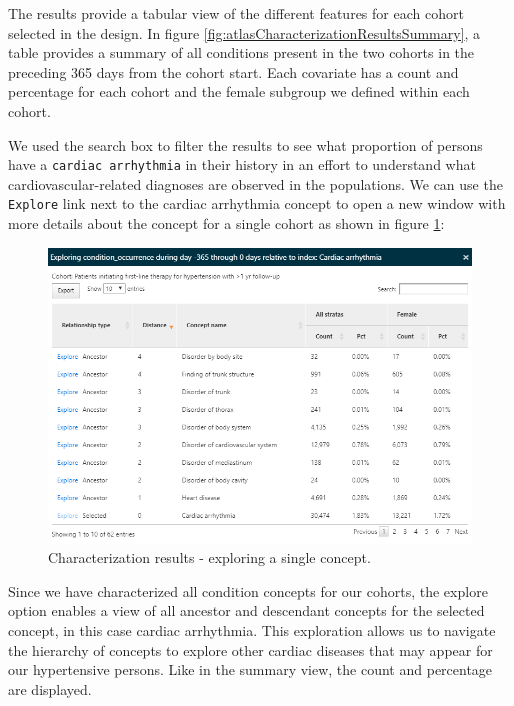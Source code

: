 \documentclass[11pt]{book}
\theoremstyle{definition}
\theoremstyle{definition}
\theoremstyle{definition}
\theoremstyle{remark}
\begin{document}
The results provide a tabular view of the different features for each cohort selected in the design. In figure \ref{fig:atlasCharacterizationResultsSummary}, a table provides a summary of all conditions present in the two cohorts in the preceding 365 days from the cohort start. Each covariate has a count and percentage for each cohort and the female subgroup we defined within each cohort.

We used the search box to filter the results to see what proportion of persons have a \texttt{cardiac\ arrhythmia} in their history in an effort to understand what cardiovascular-related diagnoses are observed in the populations. We can use the \texttt{Explore} link next to the cardiac arrhythmia concept to open a new window with more details about the concept for a single cohort as shown in figure \ref{fig:atlasCharacterizationResultsExplore}:

\begin{figure}

{\centering \includegraphics[width=1\linewidth]{images/Characterization/atlasCharacterizationResultsExplore} 

}

\caption{Characterization results - exploring a single concept.}\label{fig:atlasCharacterizationResultsExplore}
\end{figure}

Since we have characterized all condition concepts for our cohorts, the explore option enables a view of all ancestor and descendant concepts for the selected concept, in this case cardiac arrhythmia. This exploration allows us to navigate the hierarchy of concepts to explore other cardiac diseases that may appear for our hypertensive persons. Like in the summary view, the count and percentage are displayed.
\end{document}

